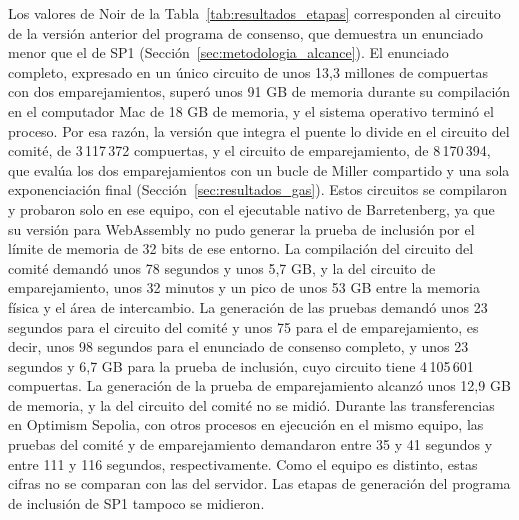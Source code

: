 Los valores de Noir de la Tabla~\ref{tab:resultados_etapas} corresponden al circuito de la versión
anterior del programa de consenso, que demuestra un enunciado menor que el de SP1
(Sección~\ref{sec:metodologia_alcance}). El enunciado completo, expresado en un único circuito de
unos 13,3 millones de compuertas con dos emparejamientos, superó unos 91 GB de memoria durante su
compilación en el computador Mac de 18 GB de memoria, y el sistema operativo terminó el proceso.
Por esa razón, la versión que integra el puente lo divide en el circuito del comité, de
3\,117\,372 compuertas, y el circuito de emparejamiento, de 8\,170\,394, que evalúa los dos
emparejamientos con un bucle de Miller compartido y una sola exponenciación final
(Sección~\ref{sec:resultados_gas}). Estos circuitos se
compilaron y probaron solo en ese equipo, con el ejecutable nativo de Barretenberg, ya que su
versión para WebAssembly no pudo generar la prueba de inclusión por el límite de memoria de
32 bits de ese entorno. La compilación del circuito del comité demandó unos 78 segundos y unos
5,7 GB, y la del circuito de emparejamiento, unos 32 minutos y un pico de unos 53 GB entre la
memoria física y el área de intercambio. La generación de las pruebas demandó unos 23 segundos
para el circuito del comité y unos 75 para el de emparejamiento, es decir, unos 98 segundos para
el enunciado de consenso completo, y unos 23 segundos y 6,7 GB para la prueba de inclusión, cuyo
circuito tiene 4\,105\,601 compuertas. La generación de la prueba de emparejamiento alcanzó unos
12,9 GB de memoria, y la del circuito del comité no se midió. Durante las transferencias en
Optimism Sepolia, con otros procesos en ejecución en el mismo equipo, las pruebas del comité y de
emparejamiento demandaron entre 35 y 41 segundos y entre 111 y 116 segundos, respectivamente. Como
el equipo es distinto, estas cifras no se comparan con las del servidor. Las
etapas de generación del programa de inclusión de SP1 tampoco se midieron.

